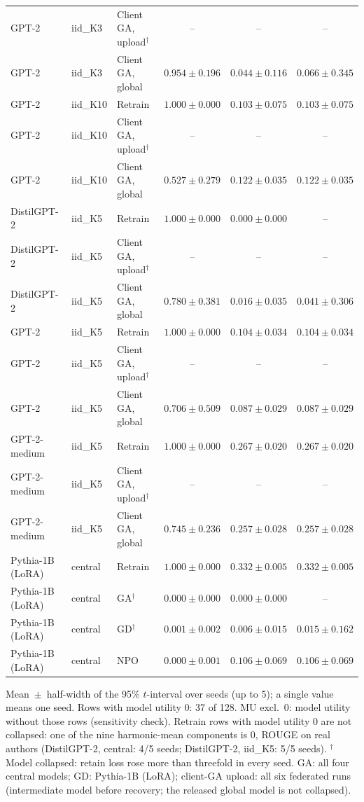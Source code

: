 \begin{table}[t]
\begin{tabular*}{\textwidth}{@{\extracolsep{\fill}}lllccc@{}}
GPT-2 & iid\_K3 & Client GA, upload$^{\dagger}$ & -- & -- & -- \\
GPT-2 & iid\_K3 & Client GA, global & $0.954 \pm 0.196$ & $0.044 \pm 0.116$ & $0.066 \pm 0.345$ \\
GPT-2 & iid\_K10 & Retrain & $1.000 \pm 0.000$ & $0.103 \pm 0.075$ & $0.103 \pm 0.075$ \\
GPT-2 & iid\_K10 & Client GA, upload$^{\dagger}$ & -- & -- & -- \\
GPT-2 & iid\_K10 & Client GA, global & $0.527 \pm 0.279$ & $0.122 \pm 0.035$ & $0.122 \pm 0.035$ \\
DistilGPT-2 & iid\_K5 & Retrain & $1.000 \pm 0.000$ & $0.000 \pm 0.000$ & -- \\
DistilGPT-2 & iid\_K5 & Client GA, upload$^{\dagger}$ & -- & -- & -- \\
DistilGPT-2 & iid\_K5 & Client GA, global & $0.780 \pm 0.381$ & $0.016 \pm 0.035$ & $0.041 \pm 0.306$ \\
GPT-2 & iid\_K5 & Retrain & $1.000 \pm 0.000$ & $0.104 \pm 0.034$ & $0.104 \pm 0.034$ \\
GPT-2 & iid\_K5 & Client GA, upload$^{\dagger}$ & -- & -- & -- \\
GPT-2 & iid\_K5 & Client GA, global & $0.706 \pm 0.509$ & $0.087 \pm 0.029$ & $0.087 \pm 0.029$ \\
GPT-2-medium & iid\_K5 & Retrain & $1.000 \pm 0.000$ & $0.267 \pm 0.020$ & $0.267 \pm 0.020$ \\
GPT-2-medium & iid\_K5 & Client GA, upload$^{\dagger}$ & -- & -- & -- \\
GPT-2-medium & iid\_K5 & Client GA, global & $0.745 \pm 0.236$ & $0.257 \pm 0.028$ & $0.257 \pm 0.028$ \\
Pythia-1B (LoRA) & central & Retrain & $1.000 \pm 0.000$ & $0.332 \pm 0.005$ & $0.332 \pm 0.005$ \\
Pythia-1B (LoRA) & central & GA$^{\dagger}$ & $0.000 \pm 0.000$ & $0.000 \pm 0.000$ & -- \\
Pythia-1B (LoRA) & central & GD$^{\dagger}$ & $0.001 \pm 0.002$ & $0.006 \pm 0.015$ & $0.015 \pm 0.162$ \\
Pythia-1B (LoRA) & central & NPO & $0.000 \pm 0.001$ & $0.106 \pm 0.069$ & $0.106 \pm 0.069$ \\
\bottomrule
\end{tabular*}

\smallskip
{\footnotesize Mean~$\pm$~half-width of the 95\% $t$-interval over seeds (up to 5); a single value means one seed. Rows with model utility 0: 37 of 128. MU excl.\ 0: model utility without those rows (sensitivity check). Retrain rows with model utility 0 are not collapsed: one of the nine harmonic-mean components is 0, ROUGE on real authors (DistilGPT-2, central: 4/5 seeds; DistilGPT-2, iid\_K5: 5/5 seeds). $^{\dagger}$Model collapsed: retain loss rose more than threefold in every seed. GA: all four central models; GD: Pythia-1B (LoRA); client-GA upload: all six federated runs (intermediate model before recovery; the released global model is not collapsed).\par}
\end{table}
